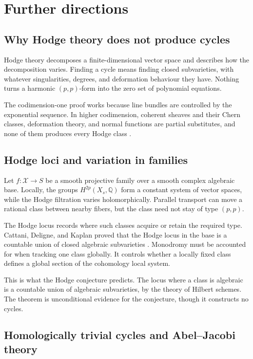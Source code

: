 \documentclass[11pt,reqno]{amsart}
\theoremstyle{definition}
\theoremstyle{remark}
\numberwithin{equation}{section}
\newcommand{\Q}{\mathbb{Q}}
\begin{document}
\section{Further directions}\label{sec:research}

\subsection{Why Hodge theory does not produce cycles}

Hodge theory decomposes a finite-dimensional vector space and describes how
the decomposition varies. Finding a cycle means finding closed
subvarieties, with whatever singularities, degrees, and deformation
behaviour they have. Nothing turns a harmonic $(p,p)$-form into the zero
set of polynomial equations.

The codimension-one proof works because line bundles are controlled by
the exponential sequence. In higher codimension, coherent sheaves and
their Chern classes, deformation theory, and normal functions are partial
substitutes, and none of them produces every Hodge class
\cite{voisin2016hodge}.

\subsection{Hodge loci and variation in families}

Let $f:\mathcal X\to S$ be a smooth projective family over a smooth
complex algebraic base. Locally, the groups $H^{2p}(X_s,\Q)$ form a
constant system of vector spaces, while the Hodge filtration varies
holomorphically. Parallel transport can move a rational class between
nearby fibers, but the class need not stay of type $(p,p)$.

The Hodge locus records where such classes acquire or retain the required
type. Cattani, Deligne, and Kaplan proved that the Hodge locus in the
base is a countable union of closed algebraic subvarieties
\cite{cdk1995}. Monodromy must be accounted for when tracking one class
globally. It controls whether a locally fixed class defines a global
section of the cohomology local system.

This is what the Hodge conjecture predicts. The locus where a class is
algebraic is a countable union of algebraic subvarieties, by the theory of
Hilbert schemes. The theorem is unconditional evidence for the conjecture,
though it constructs no cycles.

\subsection{Homologically trivial cycles and Abel--Jacobi theory}
\label{subsec:abel-jacobi}
\end{document}
